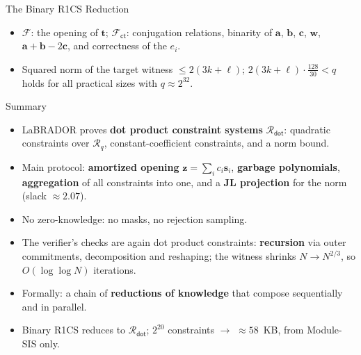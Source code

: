 \documentclass{zkdl-presentation-template}
\begin{document}
\begin{frame}{The Binary R1CS Reduction}
        \vspace{5pt}
        \begin{itemize}
            \item $\mathcal{F}$: the opening of $\mathbf{t}$; $\mathcal{F}_{\mathsf{ct}}$: conjugation relations, binarity of $\mathbf{a}$, $\mathbf{b}$, $\mathbf{c}$, $\mathbf{w}$, $\mathbf{a} + \mathbf{b} - 2\mathbf{c}$, and correctness of the $e_i$.\pause
            \item Squared norm of the target witness $\leq 2(3k + \ell)$; $2(3k + \ell)\cdot\frac{128}{30} < q$ holds for all practical sizes with $q \approx 2^{32}$.
        \end{itemize}
    \end{frame}

    \begin{frame}{Summary}
        \begin{itemize}
            \item LaBRADOR proves \textbf{dot product constraint systems} $\mathcal{R}_{\mathsf{dot}}$: quadratic constraints over $\mathcal{R}_q$, constant-coefficient constraints, and a norm bound.\pause
            \item Main protocol: \textbf{amortized opening} $\mathbf{z} = \sum_i c_i\mathbf{s}_i$, \textbf{garbage polynomials}, \textbf{aggregation} of all constraints into one, and a \textbf{JL projection} for the norm (slack $\approx 2.07$).\pause
            \item No zero-knowledge: no masks, no rejection sampling.\pause
            \item The verifier's checks are again dot product constraints: \textbf{recursion} via outer commitments, decomposition and reshaping; the witness shrinks $N \to N^{2/3}$, so $O(\log\log N)$ iterations.\pause
            \item Formally: a chain of \textbf{reductions of knowledge} that compose sequentially and in parallel.\pause
            \item Binary R1CS reduces to $\mathcal{R}_{\mathsf{dot}}$; $2^{20}$ constraints $\to$ $\approx 58$~KB, from Module-SIS only.
        \end{itemize}
    \end{frame}

    \makeclosingframe
\end{document}
